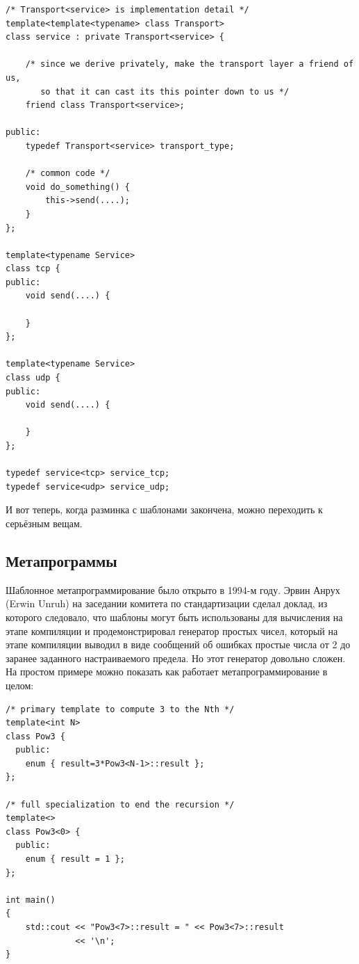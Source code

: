 \documentclass[a4paper,12pt,oneside]{article}
\begin{document}
\begin{lstlisting}
/* Transport<service> is implementation detail */
template<template<typename> class Transport>
class service : private Transport<service> {

    /* since we derive privately, make the transport layer a friend of us, 
       so that it can cast its this pointer down to us */
    friend class Transport<service>;

public:
    typedef Transport<service> transport_type;

    /* common code */
    void do_something() { 
        this->send(....);
    }
};

template<typename Service>
class tcp {
public:
    void send(....) {

    }
};

template<typename Service>
class udp {
public:
    void send(....) {

    }
};

typedef service<tcp> service_tcp;
typedef service<udp> service_udp;
\end{lstlisting}

И вот теперь, когда разминка с шаблонами закончена, можно переходить к серьёзным вещам.

\subsection{Метапрограммы}

Шаблонное метапрограммирование было открыто в 1994-м году. Эрвин Анрух (Erwin Unruh) на заседании комитета по стандартизации сделал доклад, из которого следовало, что шаблоны могут быть использованы для вычисления на этапе компиляции и продемонстрировал генератор простых чисел, который на этапе компиляции выводил в виде сообщений об ошибках простые числа от 2 до заранее заданного настраиваемого предела. Но этот генератор довольно сложен. На простом примере можно показать как работает метапрограммирование в целом:

\begin{lstlisting}
/* primary template to compute 3 to the Nth */
template<int N> 
class Pow3 { 
  public: 
    enum { result=3*Pow3<N-1>::result }; 
}; 

/* full specialization to end the recursion */
template<> 
class Pow3<0> { 
  public: 
    enum { result = 1 }; 
}; 

int main() 
{ 
    std::cout << "Pow3<7>::result = " << Pow3<7>::result 
              << '\n'; 
} 
\end{lstlisting}
\end{document}
